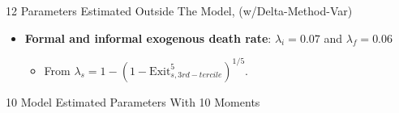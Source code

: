 \documentclass[11pt,aspectratio=169]{beamer}
\begin{document}
\begin{frame}{12 Parameters Estimated Outside The Model, (w/Delta-Method-Var)}
\begin{itemize}
\begin{itemize}
    \end{itemize}
    \item \textbf{Formal and informal exogenous death rate}: $\lambda_i = 0.07$ and $\lambda_f = 0.06$
    \begin{itemize}
        \item From $\lambda_s = 1 - (1 - \text{Exit}_{s,3rd-tercile}^5)^{1/5}$.
    \end{itemize}
\end{itemize}

\end{frame}


\begin{frame}{10 Model Estimated Parameters With 10 Moments}


\end{frame}
\end{document}
